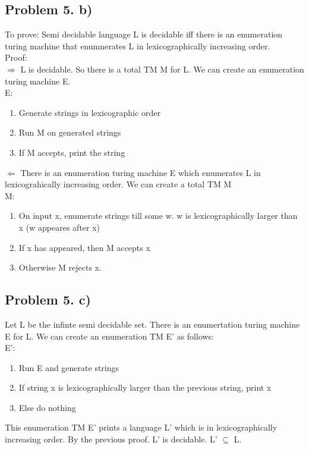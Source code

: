 \documentclass[12pt]{article}
\begin{document}
\subsection{Problem 5. b)}
To prove: Semi decidable language L is decidable iff there is an enumeration turing machine that enumnerates L in lexicographically increasing order.\\
Proof:\\
\(\Rightarrow\) L is decidable. So there is a total TM M for L. We can create an enumeration turing machine E. \\
E:
\begin{enumerate}
	\item Generate strings in lexicographic order
	\item Run M on generated strings
	\item If M accepts, print the string
\end{enumerate}
\(\Leftarrow\) There is an enumeration turing machine E which enumerates L in lexicograhically increasing order. We can create a total TM M\\
M:
\begin{enumerate}
	\item On input x, enumerate strings till some w. w is lexicographically larger than x (w appeares after x)
	\item If x has appeared, then M accepts x
	\item Otherwise M rejects x.
\end{enumerate}


\subsection{Problem 5. c)}
 Let L be the infinte semi decidable set. There is an enumertation turing machine E for L. We can create an enumeration TM E' as follows:\\
 E':
 \begin{enumerate}
 	\item Run E and generate strings
 	\item If string x is lexicographically larger than the previous string, print x
 	\item Else do nothing
 \end{enumerate}
 This enumeration TM E' prints a language L' which is in lexicographically increasing order. By the previous proof. L' is decidable. L' \(\subseteq\) L. 
	
\end{document}
